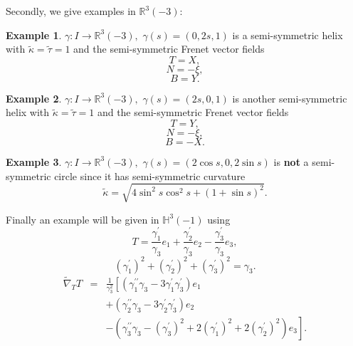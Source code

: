 \documentclass{amsart}
\theoremstyle{plain}
\theoremstyle{definition}
\newtheorem{example}{Example}
\theoremstyle{remark}
\numberwithin{equation}{section}
\begin{document}
Secondly, we give examples in $\mathbb{R}^{3}(-3)$:

\begin{example}
$\gamma :I\rightarrow \mathbb{R}^{3}(-3),$ $\gamma \left( s\right) =\left(
0,2s,1\right) $ is a semi-symmetric helix with $\widetilde{\kappa }=%
\widetilde{\tau }=1$ and the semi-symmetric Frenet vector fields%
\begin{equation*}
T=X,
\end{equation*}%
\begin{equation*}
N=-\xi ,
\end{equation*}%
\begin{equation*}
B=Y.
\end{equation*}
\end{example}

\begin{example}
$\gamma :I\rightarrow \mathbb{R}^{3}(-3),$ $\gamma \left( s\right) =\left(
2s,0,1\right) $ is another semi-symmetric helix with $\widetilde{\kappa }=%
\widetilde{\tau }=1$ and the semi-symmetric Frenet vector fields%
\begin{equation*}
T=Y,
\end{equation*}%
\begin{equation*}
N=-\xi ,
\end{equation*}%
\begin{equation*}
B=-X.
\end{equation*}
\end{example}

\begin{example}
$\gamma :I\rightarrow \mathbb{R}^{3}(-3),$ $\gamma \left( s\right) =\left(
2\cos s,0,2\sin s\right) $ is \textbf{not} a semi-symmetric circle since it
has semi-symmetric curvature 
\begin{equation*}
\widetilde{\kappa }=\sqrt{4\sin ^{2}s\cos ^{2}s+\left( 1+\sin s\right) ^{2}}.
\end{equation*}
\end{example}

Finally an example will be given in $\mathbb{H}^{3}\left( -1\right) $ using%
\begin{equation*}
T=\frac{\gamma _{1}^{\prime }}{\gamma _{3}}e_{1}+\frac{\gamma _{2}^{\prime }%
}{\gamma _{3}}e_{2}-\frac{\gamma _{3}^{\prime }}{\gamma _{3}}e_{3},
\end{equation*}%
\begin{equation*}
\left( \gamma _{1}^{\prime }\right) ^{2}+\left( \gamma _{2}^{\prime }\right)
^{2}+\left( \gamma _{3}^{\prime }\right) ^{2}=\gamma _{3}.
\end{equation*}
\begin{eqnarray*}
\widetilde{\nabla }_{T}T &=&\frac{1}{\gamma _{3}^{2}}\left[ \left( \gamma
_{1}^{\prime \prime }\gamma _{3}-3\gamma _{1}^{\prime }\gamma _{3}^{\prime
}\right) e_{1}\right. \\
&&+\left( \gamma _{2}^{\prime \prime }\gamma _{3}-3\gamma _{2}^{\prime
}\gamma _{3}^{\prime }\right) e_{2} \\
&&\left. -\left( \gamma _{3}^{\prime \prime }\gamma _{3}-\left( \gamma
_{3}^{\prime }\right) ^{2}+2\left( \gamma _{1}^{\prime }\right) ^{2}+2\left(
\gamma _{2}^{\prime }\right) ^{2}\right) e_{3}\right] .
\end{eqnarray*}
\end{document}
